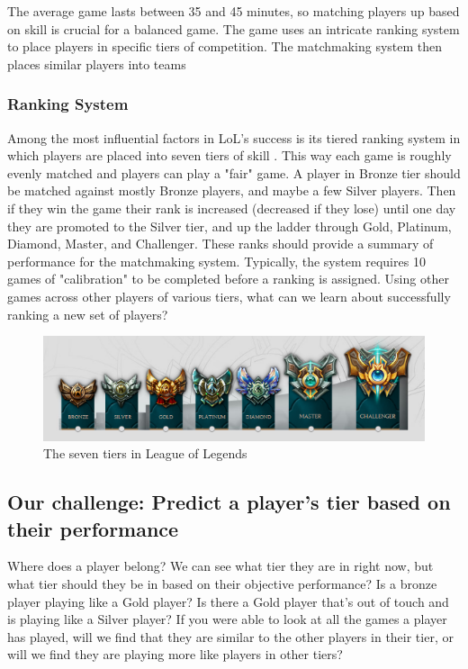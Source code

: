 \documentclass{article} %
\begin{document}
The average game lasts between 35 and 45 minutes, so matching players up based on skill is crucial for a balanced game. The game uses an intricate ranking system to place players in specific tiers of competition. The matchmaking system then places similar players into teams 

\subsubsection{Ranking System}
Among the most influential factors in LoL's success is its tiered ranking system in which players are placed into seven tiers of skill \cite{lolpopular}. This way each game is roughly evenly matched and players can play a "fair" game. A player in Bronze tier should be matched against mostly Bronze players, and maybe a few Silver players. Then if they win the game their rank is increased (decreased if they lose) until one day they are promoted to the Silver tier, and up the ladder through Gold, Platinum, Diamond, Master, and Challenger. These ranks should provide a summary of performance for the matchmaking system. Typically, the system requires 10 games of "calibration" to be completed before a ranking is assigned. Using other games across other players of various tiers, what can we learn about successfully ranking a new set of players?

\begin{figure}[h!]
\centering
\includegraphics[scale=0.7]{tiers.png}
\caption{The seven tiers in League of Legends}
\label{fig:univerise}
\end{figure}

\subsection{Our challenge: Predict a player's tier based on their performance}
Where does a player belong? We can see what tier they are in right now, but what tier should they be in based on their objective performance? Is a bronze player playing like a Gold player? Is there a Gold player that's out of touch and is playing like a Silver player? If you were able to look at all the games a player has played, will we find that they are similar to the other players in their tier, or will we find they are playing more like players in other tiers?
\end{document}
